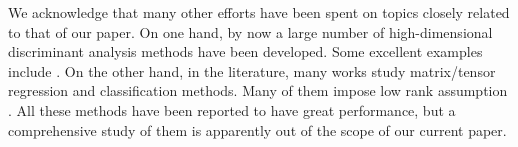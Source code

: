 


We acknowledge that many other efforts have been spent on topics closely related to that of our paper. On one hand, by now a large number of high-dimensional discriminant analysis methods have been developed. Some excellent examples include \citet{fan2008high, Tibshirani2002,Trendafilov2007, ROAD, wu2009sparse, cai2011constrained, Shao2011, Clemmensen, witten, Xu2015, Niu2015}. On the other hand, in the literature, many works study matrix/tensor regression and classification methods. Many of them impose low rank assumption \citep{Zhou2013, KoldaBader09Tensor, chi2012tensors, liu2017characterizing,CMDA, STDA, Zhong2015, Zeng2015}. All these methods have been reported to have great performance, but a comprehensive study of them is apparently out of the scope of our current paper.
















